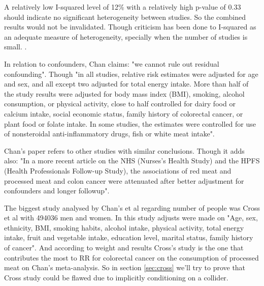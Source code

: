 \documentclass{article}
\begin{document}
A relatively low I-squared level of 12\% with a relatively high p-value of 0.33 should indicate no significant heterogeneity between studies. So the combined results would not be invalidated. Though criticism has been done to I-squared as an adequate measure of heterogeneity, specially when the number of studies is small. \cite{hippel}.

In relation to confounders, Chan claims: "we cannot rule out residual confounding". Though "in all studies, relative risk estimates were adjusted for age and sex, and all except two adjusted for total energy intake. More than
half of the study results were adjusted for body mass index (BMI), smoking, alcohol consumption, or physical activity, close to half controlled for dairy food or calcium intake, social economic status, family history of colorectal cancer, or plant food or folate intake.
In some studies, the estimates were controlled for use of nonsteroidal anti-inflammatory drugs, fish or white meat intake". %

Chan's paper refers to other studies with similar conclusions.\cite{aicr,wei2009}
Though it adds also: "In a more recent article on the NHS (Nurses's Health Study) and the HPFS (Health Professionals Follow-up Study), the associations of red meat and processed meat and colon cancer were attenuated after better adjustment for confounders and longer followup".\cite{wei}

The biggest study analysed by Chan's et al\cite{chan} regarding number of people was Cross et al\cite{cross} with 494036 men and women. In this study adjusts were made on "Age, sex, ethnicity, BMI, smoking habits, alcohol intake, physical activity, total energy intake, fruit and vegetable intake, education level, marital status, family history of cancer".
And according to weight and results Cross's study is the one that contributes the most to RR for colorectal cancer on the consumption of processed meat on Chan's meta-analysis. So in section \ref{sec:cross} we'll try to prove that Cross study could be flawed due to implicitly conditioning on a collider.
\end{document}
